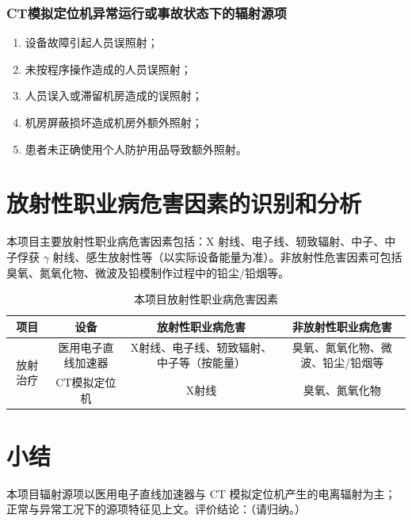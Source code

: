 \subsubsection{CT模拟定位机异常运行或事故状态下的辐射源项}

\begin{enumerate}
\item 设备故障引起人员误照射；
\item 未按程序操作造成的人员误照射；
\item 人员误入或滞留机房造成的误照射；
\item 机房屏蔽损坏造成机房外额外照射；
\item 患者未正确使用个人防护用品导致额外照射。
\end{enumerate}

\section{放射性职业病危害因素的识别和分析}

本项目主要放射性职业病危害因素包括：X 射线、电子线、轫致辐射、中子、中子俘获 $\gamma$ 射线、感生放射性等（以实际设备能量为准）。非放射性危害因素可包括臭氧、氮氧化物、微波及铅模制作过程中的铅尘/铅烟等。

\begin{table}[H]
\centering
\caption{本项目放射性职业病危害因素}
\label{tab:ch3-linac-haz}
\begin{tabular}{|c|c|c|c|}
\hline
项目 & 设备 & 放射性职业病危害 & 非放射性职业病危害 \\
\hline
\multirow{2}{*}{放射治疗}
& 医用电子直线加速器 & X射线、电子线、轫致辐射、中子等（按能量） & 臭氧、氮氧化物、微波、铅尘/铅烟等 \\
\cline{2-4}
& CT模拟定位机 & X射线 & 臭氧、氮氧化物 \\
\hline
\end{tabular}
\end{table}

\section{小结}

本项目辐射源项以医用电子直线加速器与 CT 模拟定位机产生的电离辐射为主；正常与异常工况下的源项特征见上文。评价结论：（请归纳。）
